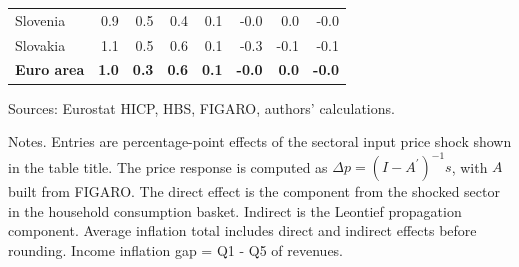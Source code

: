 \documentclass[11pt]{article}
\begin{document}
\begin{table}[H]
\begin{tabular}{lrrrrrrr}
 \\
Slovenia & 0.9 & 0.5 & 0.4 & 0.1 & -0.0 & 0.0 & -0.0
 \\
Slovakia & 1.1 & 0.5 & 0.6 & 0.1 & -0.3 & -0.1 & -0.1
 \\
\midrule
\textbf{Euro area} & \textbf{1.0} & \textbf{0.3} & \textbf{0.6} & \textbf{0.1} & \textbf{-0.0} & \textbf{0.0} & \textbf{-0.0}
 \\
\bottomrule
\end{tabular}
\par\vspace{0.35em}\footnotesize\noindent Sources: Eurostat HICP, HBS, FIGARO, authors' calculations.
\par\vspace{0.25em}\footnotesize\noindent Notes. Entries are percentage-point effects of the sectoral input price shock shown in the table title. The price response is computed as $\Delta p = (I - A^{\prime})^{-1}s$, with $A$ built from FIGARO. The direct effect is the component from the shocked sector in the household consumption basket. Indirect is the Leontief propagation component. Average inflation total includes direct and indirect effects before rounding. Income inflation gap = Q1 - Q5 of revenues.
\end{table}
\vspace{0.6em}
\end{document}
